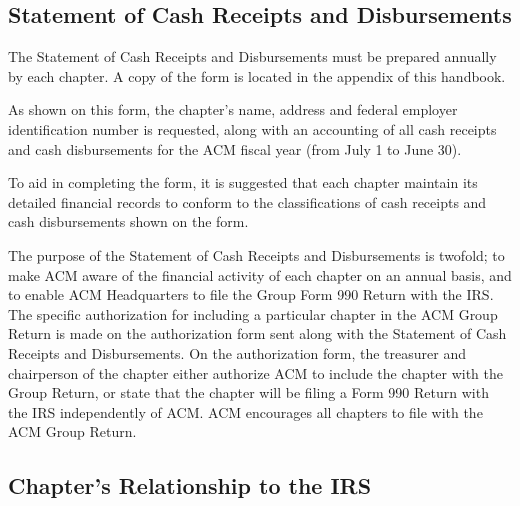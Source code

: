 \subsection{Statement of Cash Receipts and Disbursements}
The Statement of Cash Receipts and Disbursements must be prepared annually by
each chapter. A copy of the form is located in the appendix of this handbook.

As shown on this form, the chapter's name, address and federal employer
identification number is requested, along with an accounting of all cash
receipts and cash disbursements for the ACM fiscal year (from July 1 to June 30).

To aid in completing the form, it is suggested that each chapter maintain its
detailed financial records to conform to the classifications of cash receipts
and cash disbursements shown on the form.

The purpose of the Statement of Cash Receipts and Disbursements is twofold; to
make ACM aware of the financial activity of each chapter on an annual basis, and
to enable ACM Headquarters to file the Group Form 990 Return with the IRS. The
specific authorization for including a particular chapter in the ACM Group
Return is made on the authorization form sent along with the Statement of Cash
Receipts and Disbursements. On the authorization form, the treasurer and
chairperson of the chapter either authorize ACM to include the chapter with the
Group Return, or state that the chapter will be filing a Form 990 Return with
the IRS independently of ACM. ACM encourages all chapters to file with the ACM
Group Return.

\subsection{Chapter's Relationship to the IRS}
